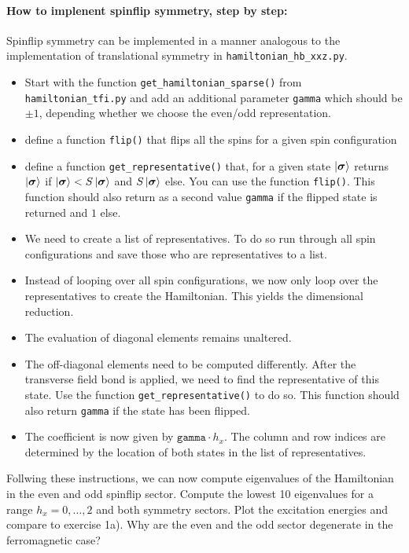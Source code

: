 \documentclass[]{article}
\theoremstyle{definition}
\begin{document}
\begin{enumerate}
  \paragraph{How to implenent spinflip symmetry, step by step:}
  Spinflip symmetry can be implemented in a manner analogous to the
  implementation of translational symmetry in
  \texttt{hamiltonian\_hb\_xxz.py}.
  \begin{itemize}
  \item Start with the function \texttt{get\_hamiltonian\_sparse()}
    from \texttt{hamiltonian\_tfi.py} and add an additional parameter
    \texttt{gamma} which should be $\pm 1$, depending whether we choose
    the even/odd representation.
  \item define a function \texttt{flip()} that flips all the spins for
    a given spin configuration
  \item define a function \texttt{get\_representative()} that, for a
    given state $\ket{\bm{\sigma}}$ returns $\ket{\bm{\sigma}}$ if
    $\ket{\bm{\sigma}} < S\ket{\bm{\sigma}}$ and $S\ket{\bm{\sigma}}$
    else. You can use the function \texttt{flip()}. This function
    should also return as a second value \texttt{gamma} if the flipped
    state is returned and $1$ else.
  \item We need to create a list of representatives. To do so run
    through all spin configurations and save those who are
    representatives to a list.
  \item Instead of looping over all spin configurations, we now only
    loop over the representatives to create the Hamiltonian. This
    yields the dimensional reduction.
  \item The evaluation of diagonal elements remains unaltered.
  \item The off-diagonal elements need to be computed differently.
    After the transverse field bond is applied, we need to find the
    representative of this state. Use the function
    \texttt{get\_representative()} to do so. This function should also
    return \texttt{gamma} if the state has been flipped.
  \item The coefficient is now given by $\texttt{gamma} \cdot h_x$.
    The column and row indices are determined by the location of both
    states in the list of representatives.
  \end{itemize}
  Follwing these instructions, we can now compute eigenvalues of the
  Hamiltonian in the even and odd spinflip sector. Compute the lowest
  10 eigenvalues for a range $h_x=0,\ldots,2$ and both symmetry
  sectors. Plot the excitation energies and compare to exercise
  1a). Why are the even and the odd sector degenerate in the
  ferromagnetic case?
  \newpage

\end{enumerate}
\end{document}
